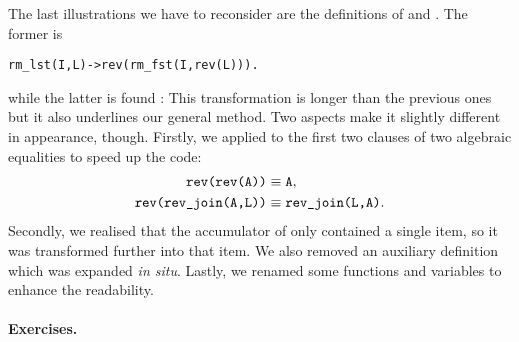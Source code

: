 The last illustrations we have to reconsider are the definitions of
 and . The former is
\begin{alltt}
rm_lst(I,L) -> rev(rm_fst(I,rev(L))).
\end{alltt}
while the latter is found :
 This transformation is longer than the
previous ones but it also underlines our general method. Two aspects
make it slightly different in appearance, though. Firstly, we applied
to the first two clauses of  two algebraic equalities
to speed up the code:
\begin{align*}
\texttt{rev(rev(A))}         &\mathrel{\equiv} \texttt{A},\\
\texttt{rev(rev\_join(A,L))} &\mathrel{\equiv}
\texttt{rev\_join(L,A)}.
\end{align*}
Secondly, we realised that the accumulator of 
only contained a single item, so it was transformed further into that
item. We also removed an auxiliary definition which was expanded
\emph{in situ}. Lastly, we renamed some functions and variables to
enhance the readability.

\medskip

\paragraph{Exercises.}
\label{ex:filtering_out}

